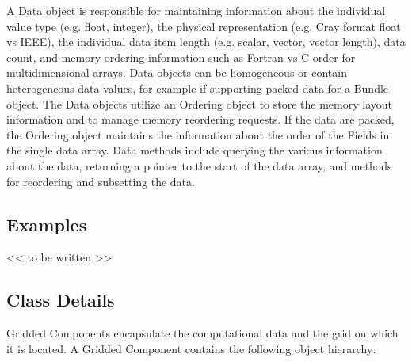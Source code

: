 A Data object is responsible for maintaining
information about the individual value type (e.g. float, integer), 
the physical representation (e.g. Cray format float vs IEEE), the 
individual data item length (e.g. scalar, vector, vector length), 
data count, and memory ordering information such as Fortran vs C order 
for multidimensional arrays.  Data objects can be homogeneous or
contain heterogeneous data values, for example if supporting
packed data for a Bundle object.
The Data objects utilize an Ordering object to store the
memory layout information and to manage memory reordering requests.
If the data are packed, the Ordering object maintains the information
about the order of the Fields in the single data array.
Data methods include querying the various information about the
data, returning a pointer to the start of the data
array, and methods for reordering and subsetting the data.


\subsection{Examples}

<< to be written >>

\subsection{Class Details}

Gridded Components encapsulate the computational data and the
grid on which it is located.  A Gridded Component contains
the following object hierarchy:



